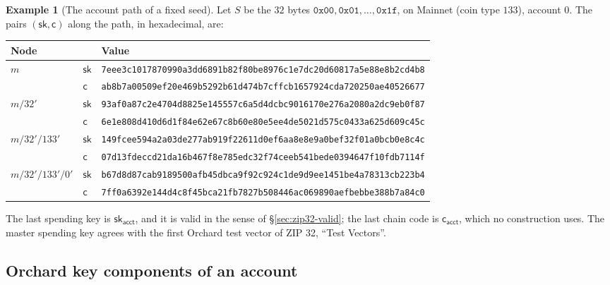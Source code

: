 \documentclass[11pt,a4paper]{article}
\theoremstyle{definition}
\newtheorem{example}[theorem]{Example}
\begin{document}
\begin{example}[The account path of a fixed seed]\label{ex:zip32-path}
Let $S$ be the $32$ bytes $\mathtt{0x00}, \mathtt{0x01}, \dots,
\mathtt{0x1f}$, on Mainnet (coin type $133$), account $0$. The pairs
$(\mathsf{sk}, \mathsf{c})$ along the path, in hexadecimal, are:
\begin{center}\footnotesize
\setlength{\tabcolsep}{3pt}
\begin{tabular}{@{}lll@{}}
\toprule
Node & & Value \\
\midrule
$m$ & $\mathsf{sk}$
  & \texttt{7eee3c1017870990a3dd6891b82f80be8976c1e7dc20d60817a5e88e8b2cd4b8}
  \\
& $\mathsf{c}$
  & \texttt{ab8b7a00509ef20e469b5292b61d474b7cffcb1657924cda720250ae40526677}
  \\
$m/32'$ & $\mathsf{sk}$
  & \texttt{93af0a87c2e4704d8825e145557c6a5d4dcbc9016170e276a2080a2dc9eb0f87}
  \\
& $\mathsf{c}$
  & \texttt{6e1e808d410d6d1f84e62e67c8b60e80e5ee4de5021d575c0433a625d609c45c}
  \\
$m/32'/133'$ & $\mathsf{sk}$
  & \texttt{149fcee594a2a03de277ab919f22611d0ef6aa8e8e9a0bef32f01a0bcb0e8c4c}
  \\
& $\mathsf{c}$
  & \texttt{07d13fdeccd21da16b467f8e785edc32f74ceeb541bede0394647f10fdb7114f}
  \\
$m/32'/133'/0'$ & $\mathsf{sk}$
  & \texttt{b67d8d87cab9189500afb45dbca9f92c924c1de9d9ee1451be4a78313cb223b4}
  \\
& $\mathsf{c}$
  & \texttt{7ff0a6392e144d4c8f45bca21fb7827b508446ac069890aefbebbe388b7a84c0}
  \\
\bottomrule
\end{tabular}
\end{center}
The last spending key is $\mathsf{sk}_{\mathsf{acct}}$, and it is valid in
the sense of \S\ref{sec:zip32-valid}; the last chain code is
$\mathsf{c}_{\mathsf{acct}}$, which no construction uses. The master
spending key agrees with the first Orchard test vector of ZIP 32, ``Test
Vectors''.
\end{example}

\subsection{Orchard key components of an account}%
\label{sec:zip32-account-keys}
\end{document}
